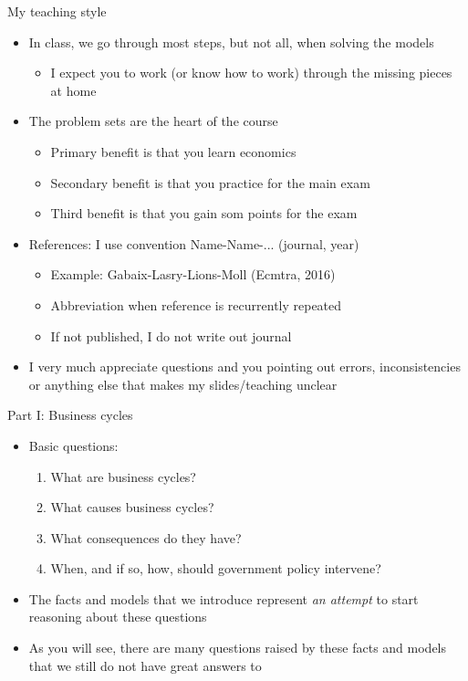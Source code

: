 \documentclass[9pt,xcolor={dvipsnames}]{beamer}
\newcommand{\bit}{\begin{itemize}}
\newcommand{\eit}{\end{itemize}}
\newcommand{\ben}{\begin{enumerate}}
\newcommand{\een}{\end{enumerate}}
\begin{document}
\begin{frame}{My teaching style}

\bit
\setlength\itemsep{2em}

\item In class, we go through most steps, but not all, when solving the models
\bit
	\item I expect you to work (or know how to work) through the missing pieces at home
\eit

\item The problem sets are the heart of the course
\bit
\setlength\itemsep{0.5em}
\item Primary benefit is that you learn economics

\item Secondary benefit is that you practice for the main exam

\item Third benefit is that you gain som points for the exam
\eit

\item References: I use convention Name-Name-... (journal, year)
\bit
\setlength\itemsep{0.5em}
\item Example: Gabaix-Lasry-Lions-Moll (Ecmtra, 2016)
\item Abbreviation when reference is recurrently repeated
\item If not published, I do not write out journal
\eit

\item I very much appreciate questions and you pointing out errors, inconsistencies or anything else that makes my slides/teaching unclear

\eit

\end{frame}



\begin{frame}{Part I: Business cycles}

\bit
\setlength\itemsep{2em}

\item Basic questions:
\ben
\setlength\itemsep{0.5em}
	\item What are business cycles?
	
	\item What causes business cycles?
	
	\item What consequences do they have?
	
	\item When, and if so, how, should government policy intervene?
\een

\item The facts and models that we introduce represent \emph{an attempt} to start reasoning about these questions

\item As you will see, there are many questions raised by these facts and models that we still do not have great answers to

\eit

\end{frame}
\end{document}
